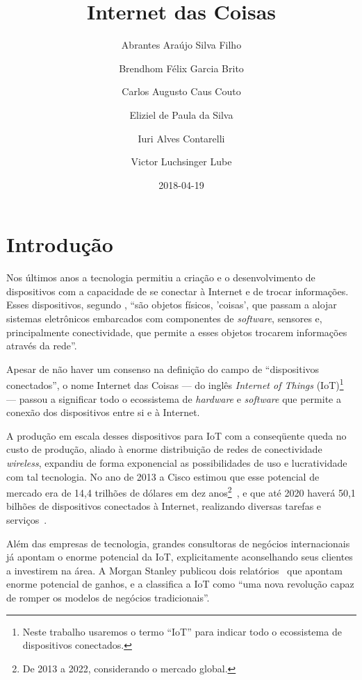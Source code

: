 \documentclass[pdftex, brazil, 12pt, twoside]{article}
\newcommand{\ingles}[1]{\textit{#1}}
\begin{document}
\title{Internet das Coisas}
\author{Abrantes Araújo Silva Filho \and Brendhom Félix Garcia Brito
  \and Carlos Augusto Caus Couto \and Eliziel de Paula da Silva \and Iuri Alves Contarelli
  \and Victor Luchsinger Lube}
\date{2018-04-19}
\maketitle
\tableofcontents


\section{Introdução}
\label{intro}

Nos últimos anos a tecnologia permitiu a criação e o desenvolvimento de dispositivos com a
capacidade de se conectar à Internet e de trocar informações. Esses dispositivos,
segundo \citet{BarbozaTCCIoT2015}, ``são objetos físicos, 'coisas', que passam
a alojar sistemas eletrônicos embarcados com componentes de \ingles{software},
sensores e, principalmente conectividade, que permite a esses objetos trocarem
informações através da rede''.

Apesar de não haver um consenso na definição do campo de ``dispositivos conectados'',
o nome Internet das Coisas --- do inglês \ingles{Internet of Things} (IoT)\footnote{Neste trabalho
  usaremos o termo ``IoT'' para indicar todo o ecossistema de dispositivos conectados.} --- passou
a significar todo o ecossistema de \ingles{hardware} e \ingles{software} que
permite a conexão dos dispositivos entre si e à Internet.

A produção em escala desses dispositivos para IoT com a conseqüente queda no custo
de produção, aliado à enorme distribuição de redes de conectividade \ingles{wireless},
expandiu de forma exponencial as possibilidades de uso e lucratividade com
tal tecnologia. No ano de 2013 a Cisco estimou que esse potencial
de mercado era de 14,4 trilhões de dólares em dez anos\footnote{De 2013 a 2022, considerando
o mercado global.}~\citep{CiscoIoTFAQ2013},
e que até 2020 haverá 50,1 bilhões de dispositivos conectados à Internet,
realizando diversas tarefas e serviços~\citep{CiscoIoEConnectionsCounter}.

Além das empresas de tecnologia, grandes consultoras de negócios internacionais
já apontam o enorme potencial da IoT, explicitamente aconselhando
seus clientes a investirem na área.
A Morgan Stanley publicou dois relatórios~\citep{MorganStanleyIoTnow2013,MorganStanleyIoTpersonal2014}
que apontam enorme potencial de ganhos, e a \citet{OliverWymanIoT2015} classifica
a IoT como ``uma nova revolução capaz de romper os modelos de negócios tradicionais''.
\end{document}

